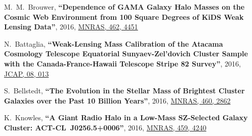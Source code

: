 \documentclass{article}
\def\myself{\textbf{\color{red} C.~Sif\'on}}
\def\jcap{JCAP}
\def\mnras{MNRAS}
\newcommand{\paper}[1]{\textbf{``#1''}}
\begin{document}
\begin{etaremune}
\item
M.~M.~Brouwer, 
\paper{Dependence of GAMA Galaxy Halo Masses on the Cosmic Web Environment from 
100 Square Degrees of KiDS Weak Lensing Data},
2016, \href{http://adsabs.harvard.edu/abs/2016MNRAS.462.4451B}{\mnras, 462, 4451}

\item
N.~Battaglia, 
\paper{Weak-Lensing Mass Calibration of the Atacama Cosmology Telescope Equatorial 
Sunyaev-Zel'dovich Cluster Sample with the Canada-France-Hawaii Telescope Stripe 82 Survey},
2016, \href{http://adsabs.harvard.edu/abs/2016JCAP...08..013B}{\jcap, 08, 013}

\item
S.~Bellstedt, 
\paper{The Evolution in the Stellar Mass of Brightest Cluster Galaxies over the 
Past 10 Billion Years},
2016, \href{http://adsabs.harvard.edu/abs/2016MNRAS.460.2862B}{\mnras, 460, 2862}

\item
K.~Knowles, 
\paper{A Giant Radio Halo in a Low-Mass SZ-Selected Galaxy Cluster: ACT-CL~J0256.5+0006},
2016, \href{http://adsabs.harvard.edu/adsabs/abs/2016MNRAS.459.4240K}{\mnras, 459, 4240}


\end{etaremune}
\end{document}
